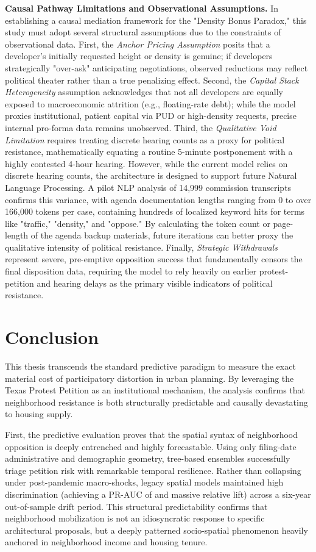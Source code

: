 \documentclass[11pt, letterpaper, oneside]{article}
\begin{document}
\textbf{Causal Pathway Limitations and Observational Assumptions.} In establishing a causal mediation framework for the "Density Bonus Paradox," this study must adopt several structural assumptions due to the constraints of observational data. First, the \textit{Anchor Pricing Assumption} posits that a developer's initially requested height or density is genuine; if developers strategically "over-ask" anticipating negotiations, observed reductions may reflect political theater rather than a true penalizing effect. Second, the \textit{Capital Stack Heterogeneity} assumption acknowledges that not all developers are equally exposed to macroeconomic attrition (e.g., floating-rate debt); while the model proxies institutional, patient capital via PUD or high-density requests, precise internal pro-forma data remains unobserved. Third, the \textit{Qualitative Void Limitation} requires treating discrete hearing counts as a proxy for political resistance, mathematically equating a routine 5-minute postponement with a highly contested 4-hour hearing. However, while the current model relies on discrete hearing counts, the architecture is designed to support future Natural Language Processing. A pilot NLP analysis of 14,999 commission transcripts confirms this variance, with agenda documentation lengths ranging from 0 to over 166,000 tokens per case, containing hundreds of localized keyword hits for terms like "traffic," "density," and "oppose." By calculating the token count or page-length of the agenda backup materials, future iterations can better proxy the qualitative intensity of political resistance. Finally, \textit{Strategic Withdrawals} represent severe, pre-emptive opposition success that fundamentally censors the final disposition data, requiring the model to rely heavily on earlier protest-petition and hearing delays as the primary visible indicators of political resistance.

\section{Conclusion}

This thesis transcends the standard predictive paradigm to measure the exact material cost of participatory distortion in urban planning. By leveraging the Texas Protest Petition as an institutional mechanism, the analysis confirms that neighborhood resistance is both structurally predictable and causally devastating to housing supply.

First, the predictive evaluation proves that the spatial syntax of neighborhood opposition is deeply entrenched and highly forecastable. Using only filing-date administrative and demographic geometry, tree-based ensembles successfully triage petition risk with remarkable temporal resilience. Rather than collapsing under post-pandemic macro-shocks, legacy spatial models maintained high discrimination (achieving a PR-AUC of \metricBootstrapFiling{} and massive relative lift) across a six-year out-of-sample drift period. This structural predictability confirms that neighborhood mobilization is not an idiosyncratic response to specific architectural proposals, but a deeply patterned socio-spatial phenomenon heavily anchored in neighborhood income and housing tenure.
\end{document}
